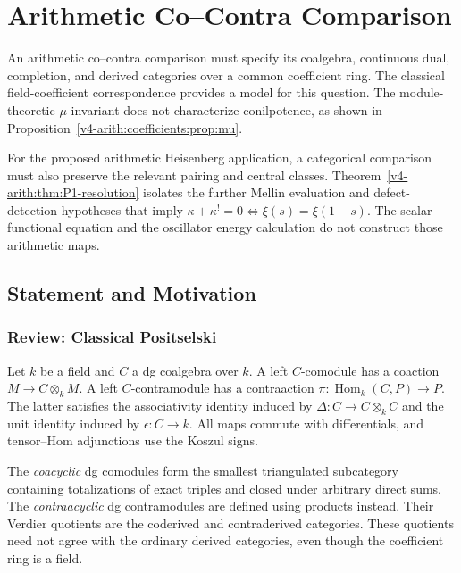 \chapter{Arithmetic Co--Contra Comparison}
\label{v4-arith:arith-positselski}

An arithmetic co--contra comparison must specify its coalgebra,
continuous dual, completion, and derived categories over a common
coefficient ring. The classical field-coefficient correspondence
provides a model for this question. The module-theoretic
\(\mu\)-invariant does not characterize conilpotence, as shown in
Proposition~\ref{v4-arith:coefficients:prop:mu}.

For the proposed arithmetic Heisenberg application, a categorical
comparison must also preserve the relevant pairing and central
classes. Theorem~\ref{v4-arith:thm:P1-resolution} isolates the further
Mellin evaluation and defect-detection hypotheses that imply
\(\kappa+\kappa^!=0\Longleftrightarrow\xi(s)=\xi(1-s)\).
The scalar functional equation and the oscillator energy calculation
do not construct those arithmetic maps.

\section{Statement and Motivation}
\label{v4-arith:pos:statement}

\subsection{Review: Classical Positselski}
\label{v4-arith:pos:classical}

Let \(k\) be a field and \(C\) a dg coalgebra over \(k\).
A left \(C\)-comodule has a coaction \(M\to C\otimes_k M\).
A left \(C\)-contramodule has a contraaction
\(\pi:\operatorname{Hom}_k(C,P)\to P\).
The latter satisfies the associativity identity induced by
\(\Delta:C\to C\otimes_k C\) and the unit identity induced by
\(\epsilon:C\to k\). All maps commute with differentials,
and tensor--Hom adjunctions use the Koszul signs.

The \emph{coacyclic} dg comodules form the smallest triangulated
subcategory containing totalizations of exact triples and closed
under arbitrary direct sums. The \emph{contraacyclic} dg
contramodules are defined using products instead.
Their Verdier quotients are the coderived and contraderived
categories. These quotients need not agree with the ordinary
derived categories, even though the coefficient ring is a field.

